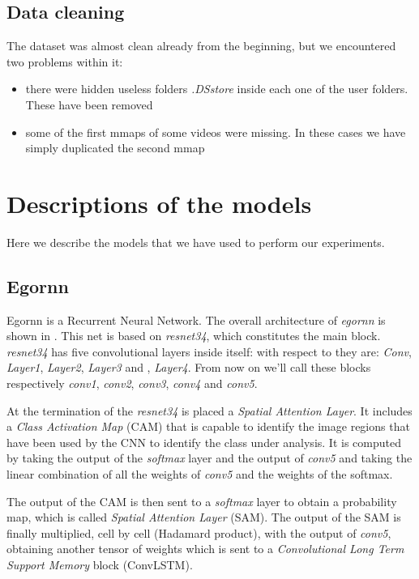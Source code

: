 \documentclass[10pt,twocolumn,hidelinks,letterpaper]{article}
\begin{document}
\subsection{Data cleaning}

The dataset was almost clean already from the beginning, but we encountered two problems within it:
\begin{itemize}
  \item there were hidden useless folders \textit{.DSstore} inside each one of the user folders. These have been removed
  \item some of the first mmaps of some videos were missing. In these cases we have simply duplicated the second mmap
\end{itemize}

\section{Descriptions of the models}

Here we describe the models that we have used to perform our experiments.

\subsection{Egornn}

Egornn is a Recurrent Neural Network. The overall architecture of \textit{egornn} is shown in . This net is based on \textit{resnet34}\cite{resnet}, which constitutes the main block. \textit{resnet34} has five convolutional layers inside itself: with respect to  they are: \textit{Conv}, \textit{Layer1}, \textit{Layer2}, \textit{Layer3} and , \textit{Layer4}. From now on we'll call these blocks respectively \textit{conv1}, \textit{conv2}, \textit{conv3}, \textit{conv4} and \textit{conv5}.

At the termination of the \textit{resnet34} is placed a \textit{Spatial Attention Layer}. It includes a \textit{Class Activation Map} (CAM) that is capable to identify the image regions that have been used by the CNN to identify the class under analysis. It is computed by taking the output of the \textit{softmax} layer and the output of \textit{conv5} and taking the linear combination of all the weights of \textit{conv5} and the weights of the softmax.


The output of the CAM is then sent to a \textit{softmax} layer to obtain a probability map, which is called \textit{Spatial Attention Layer} (SAM). The output of the SAM is finally multiplied, cell by cell (Hadamard product), with the output of \textit{conv5}, obtaining another tensor of weights which is sent to a \textit{Convolutional Long Term Support Memory} block (ConvLSTM).
\end{document}
